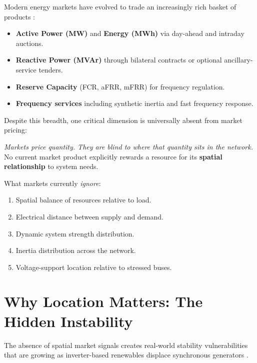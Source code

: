 \documentclass[12pt, a4paper]{article}
\begin{document}
Modern energy markets have evolved to trade an increasingly rich basket of
products \citep{entsoe2022marketreport}:

\begin{itemize}[leftmargin=2em]
  \item \textbf{Active Power (MW)} and \textbf{Energy (MWh)} via day-ahead and
        intraday auctions.
  \item \textbf{Reactive Power (MVAr)} through bilateral contracts or optional
        ancillary-service tenders.
  \item \textbf{Reserve Capacity} (FCR, aFRR, mFRR) for frequency regulation.
  \item \textbf{Frequency services} including synthetic inertia and fast
        frequency response.
\end{itemize}

\noindent
Despite this breadth, one critical dimension is universally absent from market
pricing:

\begin{tcolorbox}[colback=red!5!white, colframe=red!60!black, fonttitle=\bfseries,
                  title=The Fundamental Gap]
\textit{Markets price quantity. They are blind to where that quantity sits in
the network.}
No current market product explicitly rewards a resource for its \textbf{spatial
relationship} to system needs.
\end{tcolorbox}

What markets currently \emph{ignore}:
\begin{enumerate}[leftmargin=2em]
  \item Spatial balance of resources relative to load.
  \item Electrical distance between supply and demand.
  \item Dynamic system strength distribution.
  \item Inertia distribution across the network.
  \item Voltage-support location relative to stressed buses.
\end{enumerate}

\section{Why Location Matters: The Hidden Instability}
\label{sec:why_location}

The absence of spatial market signals creates real-world stability
vulnerabilities that are growing as inverter-based renewables displace
synchronous generators \citep{milano2018inertia}.
\end{document}
